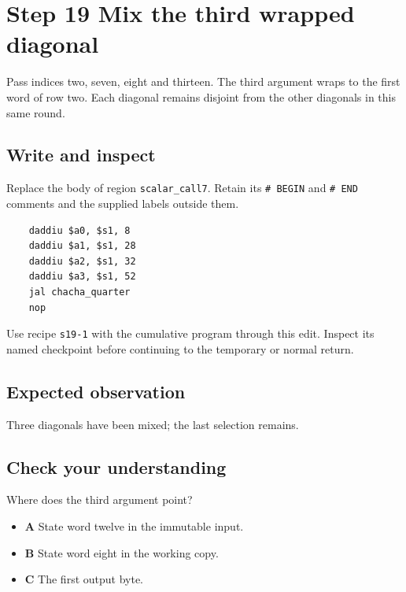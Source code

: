\section{Step 19 Mix the third wrapped diagonal}\label{chacha-s19}

Pass indices two, seven, eight and thirteen. The third argument wraps to the first word of row two. Each diagonal remains disjoint from the other diagonals in this same round.

\subsection{Write and inspect}
Replace the body of region \texttt{scalar\_call7}. Retain its \texttt{\# BEGIN} and \texttt{\# END} comments and the supplied labels outside them.

\begin{verbatim}
    daddiu $a0, $s1, 8
    daddiu $a1, $s1, 28
    daddiu $a2, $s1, 32
    daddiu $a3, $s1, 52
    jal chacha_quarter
    nop
\end{verbatim}

Use recipe \texttt{s19-1} with the cumulative program through this edit. Inspect its named checkpoint before continuing to the temporary or normal return.

\subsection{Expected observation}
Three diagonals have been mixed; the last selection remains.

\subsection{Check your understanding}
Where does the third argument point?

\begin{itemize}
\item \textbf{A} State word twelve in the immutable input.
\item \textbf{B} State word eight in the working copy.
\item \textbf{C} The first output byte.
\end{itemize}
